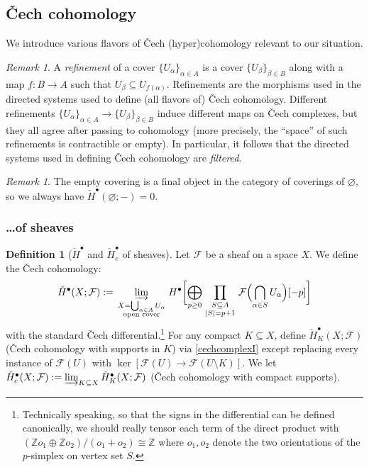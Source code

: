 \documentclass[12pt]{article}
\theoremstyle{definition}
\newtheorem{definition}[theorem]{Definition}
\theoremstyle{remark}
\newtheorem{remark}[theorem]{Remark}
\numberwithin{equation}{subsection}
\newcommand{\F}{\mathcal F}
\newcommand{\cH}{\check H}
\begin{document}
\subsection{\texorpdfstring{\v C}{C}ech cohomology}\label{cechsection}

We introduce various flavors of \v Cech (hyper)cohomology relevant to our situation.

\begin{remark}\label{coveringscategoryrmk}
A \emph{refinement} of a cover $\{U_\alpha\}_{\alpha\in A}$ is a cover $\{U_\beta\}_{\beta\in B}$ along with a map $f:B\to A$ such that $U_\beta\subseteq U_{f(\alpha)}$.  Refinements are the morphisms used in the directed systems used to define (all flavors of) \v Cech cohomology.  Different refinements $\{U_\alpha\}_{\alpha\in A}\to\{U_\beta\}_{\beta\in B}$ induce different maps on \v Cech complexes, but they all agree after passing to cohomology (more precisely, the ``space'' of such refinements is contractible or empty).  In particular, it follows that the directed systems used in defining \v Cech cohomology are \emph{filtered}.
\end{remark}

\begin{remark}
The empty covering is a final object in the category of coverings of $\varnothing$, so we always have $\cH^\bullet(\varnothing;-)=0$.
\end{remark}

\subsubsection{\ldots of sheaves}

\begin{definition}[$\cH^\bullet$ and $\cH^\bullet_c$ of sheaves]\label{cechdefnI}
Let $\F$ be a sheaf on a space $X$.  We define the \v Cech cohomology:
\begin{equation}\label{cechcomplexI}
\cH^\bullet(X;\F):=\varinjlim_{\begin{smallmatrix}X=\bigcup_{\alpha\in A}U_\alpha\cr\text{open cover}\end{smallmatrix}}H^\bullet\biggl[\bigoplus_{p\geq 0}\prod_{\begin{smallmatrix}S\subseteq A\cr\left|S\right|=p+1\end{smallmatrix}}\F\Bigl(\bigcap_{\alpha\in S}U_\alpha\Bigr)[-p]\biggr]
\end{equation}
with the standard \v Cech differential.\footnote{Technically speaking, so that the signs in the differential can be defined canonically, we should really tensor each term of the direct product with $(\mathbb Zo_1\oplus\mathbb Zo_2)/(o_1+o_2)\cong\mathbb Z$ where $o_1,o_2$ denote the two orientations of the $p$-simplex on vertex set $S$.}  For any compact $K\subseteq X$, define $\cH^\bullet_K(X;\F)$ (\v Cech cohomology with supports in $K$) via \eqref{cechcomplexI} except replacing every instance of $\F(U)$ with $\ker[\F(U)\to\F(U\setminus K)]$.  We let $\cH^\bullet_c(X;\F):=\varinjlim_{K\subseteq X}\cH^\bullet_K(X;\F)$ (\v Cech cohomology with compact supports).
\end{definition}
\end{document}
